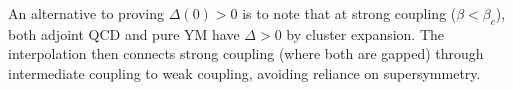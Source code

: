 \begin{remark}
\label{rem:alternative-strong}
An alternative to proving $\Delta(0) > 0$ is to note that at strong coupling 
($\beta < \beta_c$), both adjoint QCD and pure YM have $\Delta > 0$ by cluster 
expansion. The interpolation then connects strong coupling (where both are gapped) 
through intermediate coupling to weak coupling, avoiding reliance on supersymmetry.
\end{remark}






